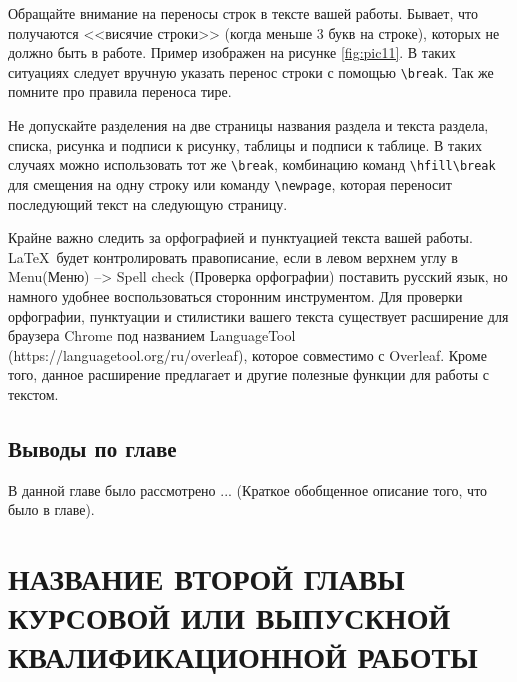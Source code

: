 \documentclass{report}
\begin{document}
Обращайте внимание на переносы строк в тексте вашей работы. Бывает, что получаются <<висячие строки>> (когда меньше 3 букв на строке), которых не должно быть в работе. Пример изображен на рисунке \ref{fig:pic11}. В таких ситуациях следует вручную указать перенос строки с помощью \verb|\break|. Так же помните про правила переноса тире.



Не допускайте разделения на две страницы названия раздела и текста раздела, списка, рисунка и подписи к рисунку, таблицы и подписи к таблице. В таких случаях можно использовать тот же \verb|\break|, комбинацию команд \verb|\hfill\break| для смещения на одну строку или команду \verb|\newpage|, которая переносит последующий текст на следующую страницу.


Крайне важно следить за орфографией и пунктуацией текста вашей работы. \LaTeX\ будет контролировать правописание, если в левом верхнем углу в Menu(Меню) --> Spell check (Проверка орфографии) поставить русский язык, но намного удобнее воспользоваться сторонним инструментом. Для проверки орфографии, пунктуации и стилистики вашего текста существует расширение для браузера Chrome под названием LanguageTool (https://languagetool.org/ru/overleaf), которое совместимо с Overleaf. Кроме того, данное расширение предлагает и другие полезные функции для работы с текстом.

\section*{Выводы по главе}
В данной главе было рассмотрено ... (Краткое обобщенное описание того, что было в главе).


\chapter{НАЗВАНИЕ ВТОРОЙ ГЛАВЫ КУРСОВОЙ ИЛИ ВЫПУСКНОЙ КВАЛИФИКАЦИОННОЙ РАБОТЫ}
\setcounter{section}{0}
\setcounter{subsection}{0}
\setcounter{equation}{0}
\end{document}
